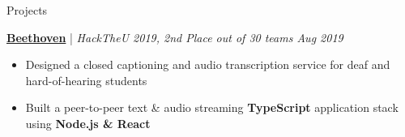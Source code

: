 \documentclass{content/resume/resume}
\begin{document}
\begin{rSection}{Projects}
  
  \href{https://devpost.com/software/beethoven-t9ud86}{\bf Beethoven} | {\em HackTheU 2019, 2nd Place out of 30 teams
  \hfill Aug 2019}
  \vspace{-6pt}
  \begin{itemize}[nosep]
    \item Designed a closed captioning and audio transcription service for deaf and hard-of-hearing students
    \item Built a peer-to-peer text \& audio streaming {\bf TypeScript} application stack using {\bf Node.js \& React}
  \end{itemize}

  
  

\end{rSection}
\end{document}
